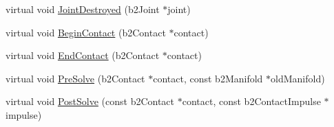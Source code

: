 \begin{DoxyCompactItemize}
\item 
virtual void \hyperlink{classSimulatorPage_a1c6a3e2ebc71dcc01aaebca77fcec421}{Joint\-Destroyed} (b2\-Joint $\ast$joint)
\item 
virtual void \hyperlink{classSimulatorPage_a5a6ea36613740fcbb301317ac48816b0}{Begin\-Contact} (b2\-Contact $\ast$contact)
\item 
virtual void \hyperlink{classSimulatorPage_a1679b66b418b92aafb7e46a47c737f03}{End\-Contact} (b2\-Contact $\ast$contact)
\item 
virtual void \hyperlink{classSimulatorPage_a0bf3450167587c8f2e013df17abecb73}{Pre\-Solve} (b2\-Contact $\ast$contact, const b2\-Manifold $\ast$old\-Manifold)
\item 
virtual void \hyperlink{classSimulatorPage_aa86fc16964e2465873d3b352d70a6ae6}{Post\-Solve} (const b2\-Contact $\ast$contact, const b2\-Contact\-Impulse $\ast$impulse)
\end{DoxyCompactItemize}
